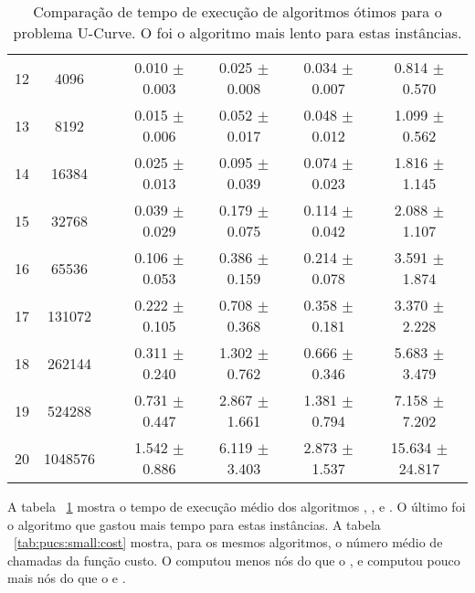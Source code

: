 \begin{table}
\begin{tabular}{cc c cccc}
12 &    4096 &&  0.010 $\pm$ 0.003 & 0.025 $\pm$ 0.008 & 0.034 $\pm$ 0.007 & 0.814 $\pm$ 0.570 \\
13 &    8192 &&  0.015 $\pm$ 0.006 & 0.052 $\pm$ 0.017 & 0.048 $\pm$ 0.012 & 1.099 $\pm$ 0.562 \\
14 &   16384 &&  0.025 $\pm$ 0.013 & 0.095 $\pm$ 0.039 & 0.074 $\pm$ 0.023 & 1.816 $\pm$ 1.145 \\
15 &   32768 &&  0.039 $\pm$ 0.029 & 0.179 $\pm$ 0.075 & 0.114 $\pm$ 0.042 & 2.088 $\pm$ 1.107 \\
16 &   65536 &&  0.106 $\pm$ 0.053 & 0.386 $\pm$ 0.159 & 0.214 $\pm$ 0.078 & 3.591 $\pm$ 1.874 \\
17 &  131072 &&  0.222 $\pm$ 0.105 & 0.708 $\pm$ 0.368 & 0.358 $\pm$ 0.181 & 3.370 $\pm$ 2.228 \\
18 &  262144 &&  0.311 $\pm$ 0.240 & 1.302 $\pm$ 0.762 & 0.666 $\pm$ 0.346 & 5.683 $\pm$ 3.479 \\
19 &  524288 &&  0.731 $\pm$ 0.447 & 2.867 $\pm$ 1.661 & 1.381 $\pm$ 0.794 & 7.158 $\pm$ 7.202 \\
20 & 1048576 &&  1.542 $\pm$ 0.886 & 6.119 $\pm$ 3.403 & 2.873 $\pm$ 1.537 & 15.634 $\pm$ 24.817 \\
\bottomrule
\end{tabular}
\caption{Comparação de tempo de execução de algoritmos ótimos para o
problema U-Curve. O  foi o algoritmo mais lento para 
estas instâncias.}
\label{tab:pucs:small:time}
\end{table}


A tabela ~\ref{tab:pucs:small:time} mostra o tempo de execução médio
dos algoritmos , ,  e
. O último foi o algoritmo que gastou mais tempo para 
estas instâncias. A tabela ~\ref{tab:pucs:small:cost} mostra, para os
mesmos algoritmos, o número médio de chamadas da função custo. O
 computou menos nós do que o , e computou
pouco mais nós do que o  e .


